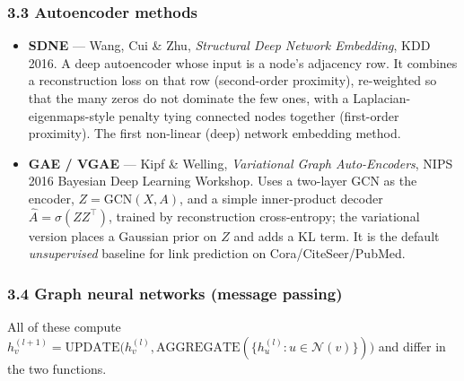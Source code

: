 \subsubsection*{3.3 Autoencoder methods}

\begin{itemize}[label=$\bullet$,leftmargin=1.3em]
  \item \textbf{SDNE} --- Wang, Cui \& Zhu, \emph{Structural Deep Network Embedding},
        KDD 2016.
        A deep autoencoder whose input is a node's adjacency row. It combines a
        reconstruction loss on that row (second-order proximity), re-weighted so that the
        many zeros do not dominate the few ones, with a Laplacian-eigenmaps-style penalty
        tying connected nodes together (first-order proximity). The first non-linear
        (deep) network embedding method.
  \item \textbf{GAE / VGAE} --- Kipf \& Welling, \emph{Variational Graph Auto-Encoders},
        NIPS 2016 Bayesian Deep Learning Workshop.
        Uses a two-layer GCN as the encoder, $Z=\mathrm{GCN}(X,A)$, and a simple inner-product
        decoder $\hat{A}=\sigma(ZZ^{\!\top})$, trained by reconstruction cross-entropy; the
        variational version places a Gaussian prior on $Z$ and adds a KL term. It is the
        default \emph{unsupervised} baseline for link prediction on Cora/CiteSeer/PubMed.
\end{itemize}

\subsubsection*{3.4 Graph neural networks (message passing)}

All of these compute $h_v^{(l+1)} = \mathrm{UPDATE}\bigl(h_v^{(l)},
\mathrm{AGGREGATE}(\{h_u^{(l)}: u\in\mathcal{N}(v)\})\bigr)$ and differ in the two functions.


